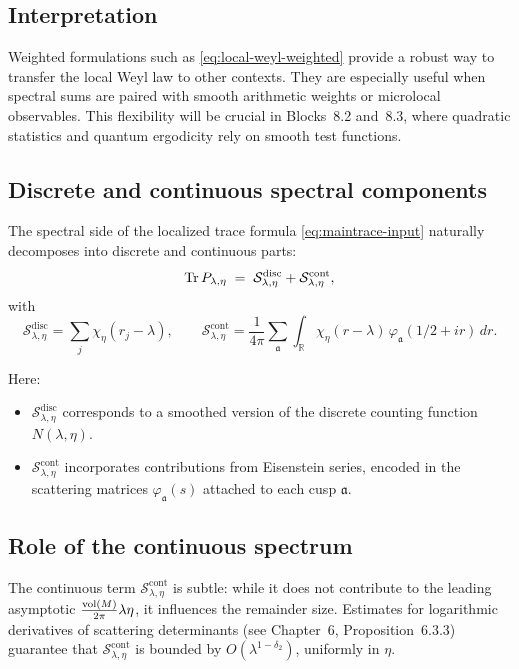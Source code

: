 \subsection{Interpretation}

Weighted formulations such as \eqref{eq:local-weyl-weighted} provide a robust way to transfer the local Weyl law to other contexts. They are especially useful when spectral sums are paired with smooth arithmetic weights or microlocal observables. This flexibility will be crucial in Blocks~8.2 and~8.3, where quadratic statistics and quantum ergodicity rely on smooth test functions.


\subsection{Discrete and continuous spectral components}

The spectral side of the localized trace formula \eqref{eq:maintrace-input} naturally decomposes into discrete and continuous parts:
\[
\operatorname{Tr} P_{\lambda,\eta}
\;=\;\mathcal{S}^{\mathrm{disc}}_{\lambda,\eta} + \mathcal{S}^{\mathrm{cont}}_{\lambda,\eta},
\]
with
\[
\mathcal{S}^{\mathrm{disc}}_{\lambda,\eta}
=\sum_j \chi_\eta(r_j-\lambda), \qquad
\mathcal{S}^{\mathrm{cont}}_{\lambda,\eta}
=\frac{1}{4\pi}\sum_{\mathfrak{a}} \int_{\mathbb{R}}
\chi_\eta(r-\lambda)\,\varphi_{\mathfrak{a}}(1/2+ir)\,dr.
\]

Here:
\begin{itemize}
  \item $\mathcal{S}^{\mathrm{disc}}_{\lambda,\eta}$ corresponds to a smoothed version of the discrete counting function $N(\lambda,\eta)$.
  \item $\mathcal{S}^{\mathrm{cont}}_{\lambda,\eta}$ incorporates contributions from Eisenstein series, encoded in the scattering matrices $\varphi_\mathfrak{a}(s)$ attached to each cusp $\mathfrak{a}$.
\end{itemize}

\subsection{Role of the continuous spectrum}

The continuous term $\mathcal{S}^{\mathrm{cont}}_{\lambda,\eta}$ is subtle: while it does not contribute to the leading asymptotic $\tfrac{\operatorname{vol}(M)}{2\pi}\lambda\eta$, it influences the remainder size. Estimates for logarithmic derivatives of scattering determinants (see Chapter~6, Proposition~6.3.3) guarantee that $\mathcal{S}^{\mathrm{cont}}_{\lambda,\eta}$ is bounded by $O(\lambda^{1-\delta_2})$, uniformly in $\eta$.

